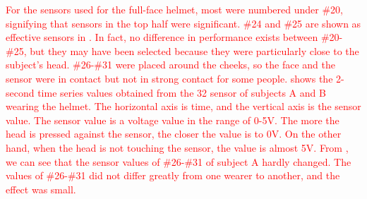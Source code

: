 \documentclass[english,preprint,JIP]{ipsj}
\begin{document}
\textcolor{red}{For the sensors used for the full-face helmet, most were numbered under \#20, signifying that sensors in the top half were significant. \#24 and \#25 are shown as effective sensors in . In fact, no difference in performance exists between \#20-\#25, but they may have been selected because they were particularly close to the subject's head. \#26-\#31 were placed around the cheeks, so the face and the sensor were in contact but not in strong contact for some people.  shows the 2-second time series values obtained from the 32 sensor of subjects A and B wearing the helmet. The horizontal axis is time, and the vertical axis is the sensor value. The sensor value is a voltage value in the range of 0-5V. The more the head is pressed against the sensor, the closer the value is to 0V. On the other hand, when the head is not touching the sensor, the value is almost 5V. From , we can see that the sensor values of \#26-\#31 of subject A hardly changed. The values of \#26-\#31 did not differ greatly from one wearer to another, and the effect was small.}
\end{document}
